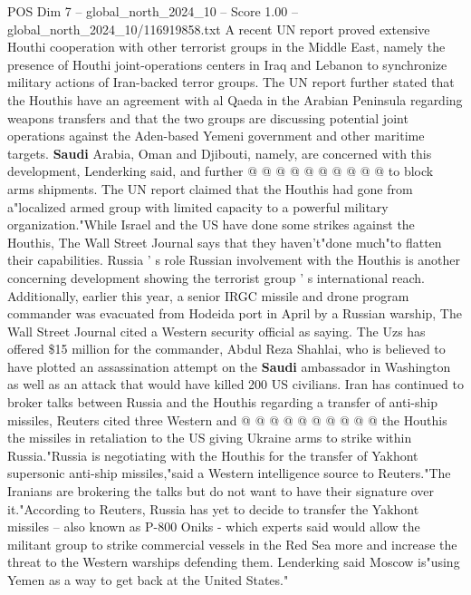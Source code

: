 \begin{textsample}{POS Dim 7 – global\_north\_2024\_10 – Score 1.00 – global\_north\_2024\_10/116919858.txt}
A recent UN report proved extensive Houthi cooperation with other terrorist groups in the Middle East, namely the presence of Houthi joint-operations centers in Iraq and Lebanon to synchronize military actions of Iran-backed terror groups.
The UN report further stated that the Houthis have an agreement with al Qaeda in the Arabian Peninsula regarding weapons transfers and that the two groups are discussing potential joint operations against the Aden-based Yemeni government and other maritime targets. \textbf{Saudi} Arabia, Oman and Djibouti, namely, are concerned with this development, Lenderking said, and further @ @ @ @ @ @ @ @ @ @ to block arms shipments.
The UN report claimed that the Houthis had gone from a"localized armed group with limited capacity to a powerful military organization."While Israel and the US have done some strikes against the Houthis, The Wall Street Journal says that they haven't"done much"to flatten their capabilities.
Russia ' s role Russian involvement with the Houthis is another concerning development showing the terrorist group ' s international reach.
Additionally, earlier this year, a senior IRGC missile and drone program commander was evacuated from Hodeida port in April by a Russian warship, The Wall Street Journal cited a Western security official as saying.
The Uzs has offered \$15 million for the commander, Abdul Reza Shahlai, who is believed to have plotted an assassination attempt on the \textbf{Saudi} ambassador in Washington as well as an attack that would have killed 200 US civilians.
Iran has continued to broker talks between Russia and the Houthis regarding a transfer of anti-ship missiles, Reuters cited three Western and @ @ @ @ @ @ @ @ @ @ the Houthis the missiles in retaliation to the US giving Ukraine arms to strike within Russia."Russia is negotiating with the Houthis for the transfer of Yakhont supersonic anti-ship missiles,"said a Western intelligence source to Reuters."The Iranians are brokering the talks but do not want to have their signature over it."According to Reuters, Russia has yet to decide to transfer the Yakhont missiles -- also known as P-800 Oniks - which experts said would allow the militant group to strike commercial vessels in the Red Sea more and increase the threat to the Western warships defending them.
Lenderking said Moscow is"using Yemen as a way to get back at the United States."

\end{textsample}
